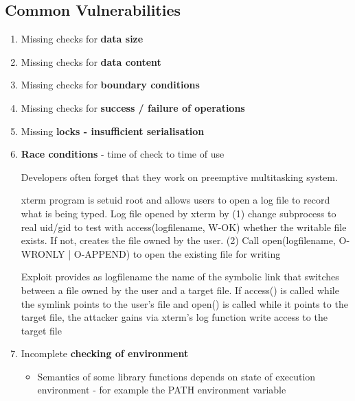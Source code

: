 \documentclass{article}
\newenvironment{example}{\par\color{brown}}{\par}
\begin{document}
\subsection{Common Vulnerabilities}
\begin{enumerate}
	\item Missing checks for \textbf{data size}
	\item Missing checks for \textbf{data content}
	\item Missing checks for \textbf{boundary conditions}
	\item Missing checks for \textbf{success / failure of operations}
	\item Missing \textbf{locks - insufficient serialisation}
	\item \textbf{Race conditions} - time of check to time of use
	
	\bigskip
	Developers often forget that they work on preemptive multitasking system.
	\begin{example}
	xterm program is setuid root and allows users to open a log file to record what is being typed. Log file opened by xterm by (1) change subprocess to real uid/gid to test with access(logfilename, W-OK) whether the writable file exists. If not, creates the file owned by the user. (2) Call open(logfilename, O-WRONLY | O-APPEND) to open the existing file for writing
	
	\bigskip
	Exploit provides as logfilename the name of the symbolic link that switches between a file owned by the user and a target file. If access() is called while the symlink points to the user's file and open() is called while it points to the target file, the attacker gains via xterm's log function write access to the target file
	\end{example}
	
	\item Incomplete \textbf{checking of environment}
	\begin{itemize}
		\item Semantics of some library functions depends on state of execution environment - for example the PATH environment variable
		

\end{itemize}
\end{enumerate}
\end{document}
